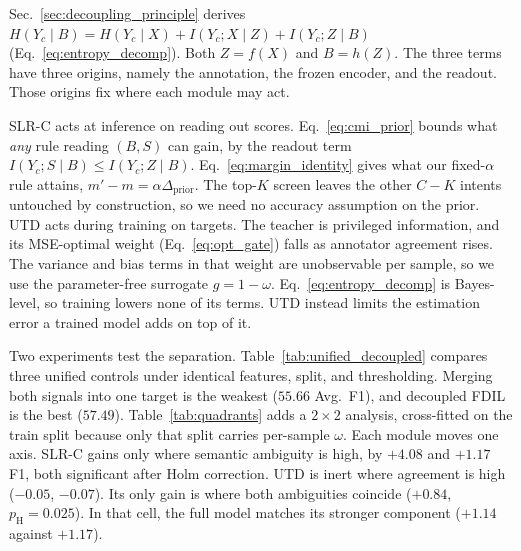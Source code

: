 
{

Sec.~\ref{sec:decoupling_principle} derives $H(Y_c\mid B)=H(Y_c\mid X)+I(Y_c;X\mid Z)+I(Y_c;Z\mid B)$ (Eq.~\eqref{eq:entropy_decomp}). Both $Z=f(X)$ and $B=h(Z)$. The three terms have three origins, namely the annotation, the frozen encoder, and the readout. Those origins fix where each module may act.

SLR-C acts at inference on reading out scores. Eq.~\eqref{eq:cmi_prior} bounds what \emph{any} rule reading $(B,S)$ can gain, by the readout term $I(Y_c;S\mid B)\le I(Y_c;Z\mid B)$. Eq.~\eqref{eq:margin_identity} gives what our fixed-$\alpha$ rule attains, $m'-m=\alpha\Delta_{\mathrm{prior}}$. The top-$K$ screen leaves the other $C-K$ intents untouched by construction, so we need no accuracy assumption on the prior. UTD acts during training on targets. The teacher is privileged information, and its MSE-optimal weight (Eq.~\eqref{eq:opt_gate}) falls as annotator agreement rises. The variance and bias terms in that weight are unobservable per sample, so we use the parameter-free surrogate $g=1-\omega$. Eq.~\eqref{eq:entropy_decomp} is Bayes-level, so training lowers none of its terms. UTD instead limits the estimation error a trained model adds on top of it.

Two experiments test the separation. Table~\ref{tab:unified_decoupled} compares three unified controls under identical features, split, and thresholding. Merging both signals into one target is the weakest ($55.66$ Avg.\ F1), and decoupled FDIL is the best ($57.49$). Table~\ref{tab:quadrants} adds a $2\times2$ analysis, cross-fitted on the train split because only that split carries per-sample $\omega$. Each module moves one axis. SLR-C gains only where semantic ambiguity is high, by $+4.08$ and $+1.17$ F1, both significant after Holm correction. UTD is inert where agreement is high ($-0.05$, $-0.07$). Its only gain is where both ambiguities coincide ($+0.84$, $p_{\mathrm H}=0.025$). In that cell, the full model matches its stronger component ($+1.14$ against $+1.17$).
}

